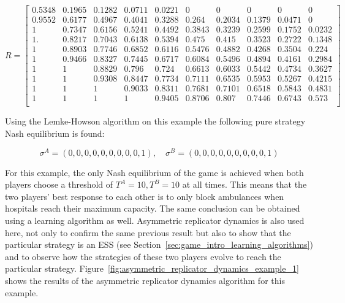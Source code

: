 \begin{equation}\label{eq:results_payoff_matrices_1}
    R = 
    \begin{bmatrix}
        0.5348 & 0.1965 & 0.1282 & 0.0711 & 0.0221 & 0      & 0      &
        0      & 0      & 0      \\
        0.9552 & 0.6177 & 0.4967 & 0.4041 & 0.3288 & 0.264  & 0.2034 &
        0.1379 & 0.0471 & 0      \\
        1      & 0.7347 & 0.6156 & 0.5241 & 0.4492 & 0.3843 & 0.3239 &
        0.2599 & 0.1752 & 0.0232 \\
        1.     & 0.8217 & 0.7043 & 0.6138 & 0.5394 & 0.475  & 0.415  &
        0.3523 & 0.2722 & 0.1348 \\
        1      & 0.8903 & 0.7746 & 0.6852 & 0.6116 & 0.5476 & 0.4882 &
        0.4268 & 0.3504 & 0.224  \\
        1      & 0.9466 & 0.8327 & 0.7445 & 0.6717 & 0.6084 & 0.5496 &
        0.4894 & 0.4161 & 0.2984 \\
        1      & 1      & 0.8829 & 0.796  & 0.724  & 0.6613 & 0.6033 &
        0.5442 & 0.4734 & 0.3627 \\
        1      & 1      & 0.9308 & 0.8447 & 0.7734 & 0.7111 & 0.6535 &
        0.5953 & 0.5267 & 0.4215 \\
        1      & 1      & 1      & 0.9033 & 0.8311 & 0.7681 & 0.7101 &
        0.6518 & 0.5843 & 0.4831 \\
        1      & 1      & 1      & 1      & 0.9405 & 0.8706 & 0.807  &
        0.7446 & 0.6743 & 0.573  \\ 
    \end{bmatrix}
\end{equation}
\normalsize

Using the Lemke-Howson algorithm on this example the following pure strategy
Nash equilibrium is found:

\begin{equation}
    \sigma^A = (0, 0, 0, 0, 0, 0, 0, 0, 0, 1), \quad
    \sigma^B = (0, 0, 0, 0, 0, 0, 0, 0, 0, 1)
\end{equation}

For this example, the only Nash equilibrium of the game is achieved when both 
players choose a threshold of \( T^A = 10, T^B = 10 \) at all times.
This means that the two players' best response to each other is to only block
ambulances when hospitals reach their maximum capacity.
The same conclusion can be obtained using a learning algorithm as well.
Asymmetric replicator dynamics is also used here, not only to confirm the same
previous result but also to show that the particular strategy is an ESS (see
Section~\ref{sec:game_intro_learning_algorithms}) and to observe how the
strategies of these two players evolve to reach the particular strategy.
Figure~\ref{fig:asymmetric_replicator_dynamics_example_1} shows the results
of the asymmetric replicator dynamics algorithm for this example.

